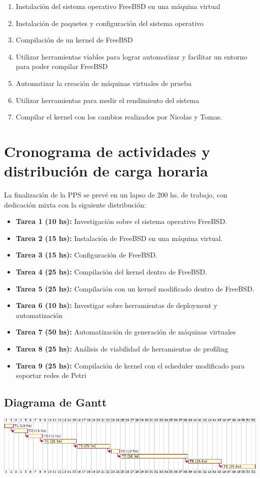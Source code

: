 \documentclass[a4paper, 11pt]{article}
\begin{document}
\begin{enumerate}
	\item Instalación del sistema operativo FreeBSD en una máquina virtual
	\item Instalación de paquetes y configuración del sistema operativo
	\item Compilación de un kernel de FreeBSD
	\item Utilizar herramientas viables para lograr automatizar y facilitar un entorno para poder compilar FreeBSD
	\item Automatizar la creación de máquinas virtuales de prueba
	\item Utilizar herramientas para medir el rendimiento del sistema
	\item Compilar el kernel con los cambios realizados por Nicolas y Tomas.
\end{enumerate}
\newpage
\section*{Cronograma de actividades y distribución de carga horaria}
	
	La finalización de la PPS se prevé en un lapso de 200 hs. de trabajo, con dedicación mixta con la siguiente distribución:
	
	\begin{itemize}
		\item \textbf{Tarea 1 (10 hs):} Investigación sobre el sistema operativo FreeBSD.
		\item \textbf{Tarea 2 (15 hs):} Instalación de FreeBSD en una máquina virtual.
		\item \textbf{Tarea 3 (15 hs):} Configuración de FreeBSD.
		\item \textbf{Tarea 4 (25 hs):} Compilación del kernel dentro de FreeBSD.
		\item \textbf{Tarea 5 (25 hs):} Compilación con un kernel modificado dentro de FreeBSD.
		\item \textbf{Tarea 6 (10 hs):} Investigar sobre herramientas de deployment y automatización
		\item \textbf{Tarea 7 (50 hs):} Automatización de generación de máquinas virtuales
		\item \textbf{Tarea 8 (25 hs):} Análisis de viabilidad de herramientas de profiling 
		\item \textbf{Tarea 9 (25 hs):} Compilación de kernel con el scheduler modificado para soportar redes de Petri
	\end{itemize}

\subsection*{Diagrama de Gantt}
	\vspace{1cm}

	\includegraphics[width=16cm]{recursos/gantt_diagram}
\end{document}
